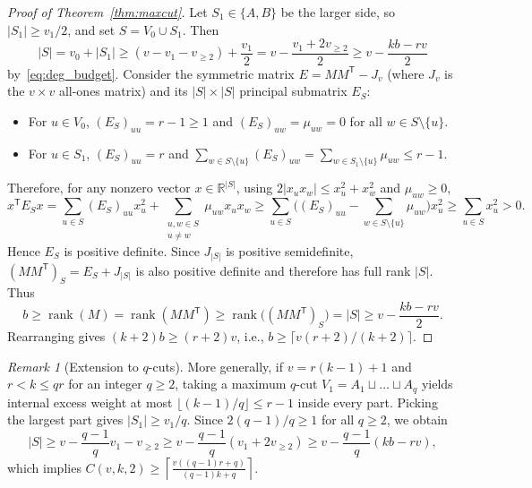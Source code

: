 \documentclass[11pt,a4paper]{article}
\theoremstyle{definition}
\theoremstyle{remark}
\newtheorem{remark}[theorem]{Remark}
\DeclareMathOperator{\rank}{rank}
\begin{document}
\begin{proof}[Proof of Theorem~\ref{thm:maxcut}]
Let $S_1 \in \{A, B\}$ be the larger side, so $|S_1| \ge v_1/2$, and set $S = V_0 \cup S_1$. Then
\begin{equation}\label{eq:S_size}
  |S| = v_0 + |S_1| \ge (v - v_1 - v_{\ge 2}) + \frac{v_1}{2} = v - \frac{v_1 + 2v_{\ge 2}}{2} \ge v - \frac{kb - rv}{2}
\end{equation}
by~\eqref{eq:deg_budget}. Consider the symmetric matrix $E = MM^\mathsf{T} - J_v$ (where $J_v$ is the $v \times v$ all-ones matrix) and its $|S| \times |S|$ principal submatrix $E_S$:
\begin{itemize}
  \item For $u \in V_0$, $(E_S)_{uu} = r - 1 \ge 1$ and $(E_S)_{uw} = \mu_{uw} = 0$ for all $w \in S \setminus \{u\}$.
  \item For $u \in S_1$, $(E_S)_{uu} = r$ and $\sum_{w \in S \setminus \{u\}} (E_S)_{uw} = \sum_{w \in S_1 \setminus \{u\}} \mu_{uw} \le r - 1$.
\end{itemize}
Therefore, for any nonzero vector $x \in \mathbb{R}^{|S|}$, using $2|x_u x_w| \le x_u^2 + x_w^2$ and $\mu_{uw} \ge 0$,
\[
  x^\mathsf{T} E_S x = \sum_{u \in S} (E_S)_{uu} x_u^2 + \sum_{\substack{u,w \in S \\ u \ne w}} \mu_{uw} x_u x_w
  \ge \sum_{u \in S} \Biggl((E_S)_{uu} - \sum_{w \in S \setminus \{u\}} \mu_{uw}\Biggr) x_u^2 \ge \sum_{u \in S} x_u^2 > 0.
\]
Hence $E_S$ is positive definite. Since $J_{|S|}$ is positive semidefinite, $(MM^\mathsf{T})_S = E_S + J_{|S|}$ is also positive definite and therefore has full rank $|S|$. Thus
\[
  b \ge \rank(M) = \rank(MM^\mathsf{T}) \ge \rank\bigl((MM^\mathsf{T})_S\bigr) = |S| \ge v - \frac{kb - rv}{2}.
\]
Rearranging gives $(k+2)b \ge (r+2)v$, i.e., $b \ge \lceil v(r+2)/(k+2) \rceil$.
\end{proof}

\begin{remark}[Extension to $q$-cuts]
More generally, if $v = r(k-1) + 1$ and $r < k \le qr$ for an integer $q \ge 2$, taking a maximum $q$-cut $V_1 = A_1 \sqcup \dots \sqcup A_q$ yields internal excess weight at most $\lfloor (k-1)/q \rfloor \le r - 1$ inside every part. Picking the largest part gives $|S_1| \ge v_1/q$. Since $2(q-1)/q \ge 1$ for all $q \ge 2$, we obtain
\[
  |S| \ge v - \frac{q-1}{q} v_1 - v_{\ge 2} \ge v - \frac{q-1}{q}(v_1 + 2v_{\ge 2}) \ge v - \frac{q-1}{q}(kb - rv),
\]
which implies $C(v,k,2) \ge \left\lceil \frac{v((q-1)r + q)}{(q-1)k + q} \right\rceil$.
\end{remark}
\end{document}

